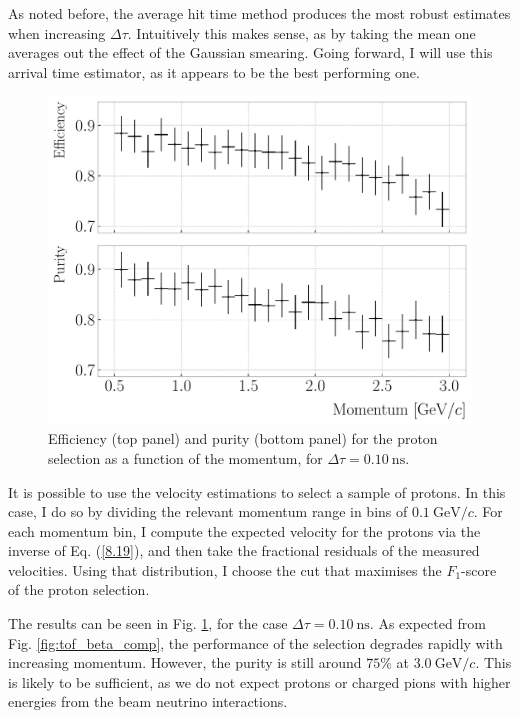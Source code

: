As noted before, the average hit time method produces the most robust estimates when increasing $\Delta \tau$. Intuitively this makes sense, as by taking the mean one averages out the effect of the Gaussian smearing. Going forward, I will use this arrival time estimator, as it appears to be the best performing one.

\begin{figure}[t]
	\centering
	\includegraphics[width=.75\linewidth]{Images/GArSoft_PID/tof/proton_selection_beta_metrics.pdf}
	\caption[Efficiency and purity for the proton selection as a function of the momentum, for $\Delta \tau = 0.10 ~ \mathrm{ns}$.]{Efficiency (top panel) and purity (bottom panel) for the proton selection as a function of the momentum, for $\Delta \tau = 0.10 ~ \mathrm{ns}$.}
	\label{fig:tof_beta_selection}
\end{figure}

It is possible to use the velocity estimations to select a sample of protons. In this case, I do so by dividing the relevant momentum range in bins of $0.1~\mathrm{GeV}/c$. For each momentum bin, I compute the expected velocity for the protons via the inverse of Eq. (\ref{8.19}), and then take the fractional residuals of the measured velocities. Using that distribution, I choose the cut that maximises the $F_{1}$-score of the proton selection.

The results can be seen in Fig. \ref{fig:tof_beta_selection}, for the case $\Delta \tau = 0.10 ~ \mathrm{ns}$. As expected from Fig. \ref{fig:tof_beta_comp}, the performance of the selection degrades rapidly with increasing momentum. However, the purity is still around $75\%$ at $3.0~\mathrm{GeV}/c$. This is likely to be sufficient, as we do not expect protons or charged pions with higher energies from the beam neutrino interactions.

